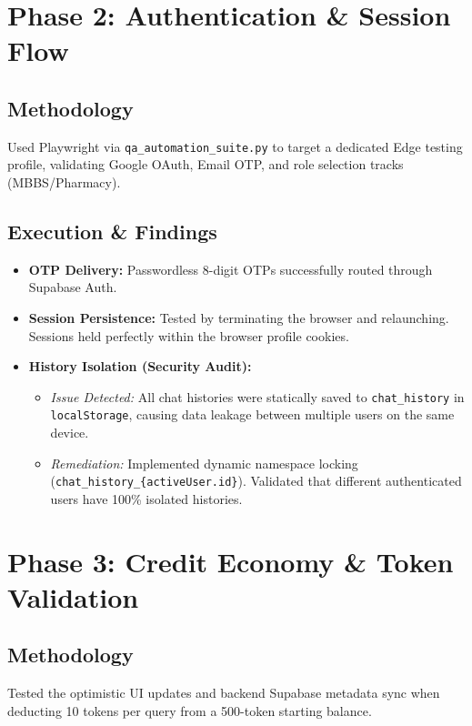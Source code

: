 \documentclass[11pt, a4paper]{article}
\begin{document}
\section{Phase 2: Authentication \& Session Flow}
\subsection{Methodology}
Used Playwright via \texttt{qa\_automation\_suite.py} to target a dedicated Edge testing profile, validating Google OAuth, Email OTP, and role selection tracks (MBBS/Pharmacy).

\subsection{Execution \& Findings}
\begin{itemize}
    \item \textbf{OTP Delivery:} Passwordless 8-digit OTPs successfully routed through Supabase Auth.
    \item \textbf{Session Persistence:} Tested by terminating the browser and relaunching. Sessions held perfectly within the browser profile cookies.
    \item \textbf{History Isolation (Security Audit):}
    \begin{itemize}
        \item \textit{Issue Detected:} All chat histories were statically saved to \texttt{chat\_history} in \texttt{localStorage}, causing data leakage between multiple users on the same device.
        \item \textit{Remediation:} Implemented dynamic namespace locking (\texttt{chat\_history\_\{activeUser.id\}}). Validated that different authenticated users have 100\% isolated histories.
    \end{itemize}
\end{itemize}

\section{Phase 3: Credit Economy \& Token Validation}
\subsection{Methodology}
Tested the optimistic UI updates and backend Supabase metadata sync when deducting 10 tokens per query from a 500-token starting balance.
\end{document}
